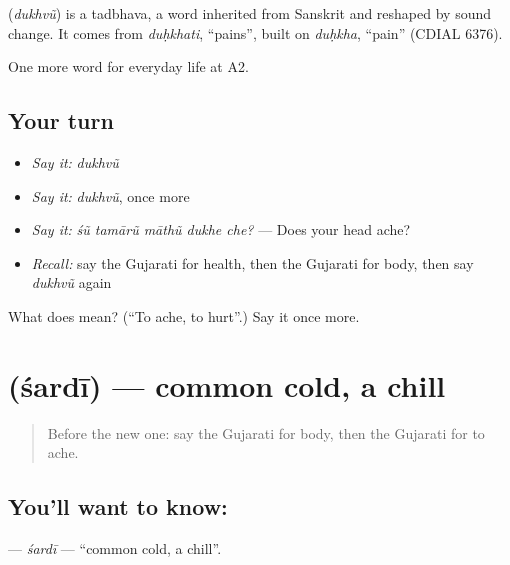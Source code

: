 \begin{cousinweb}
\textbf{} (\emph{dukhvũ}) is a tadbhava, a word inherited from Sanskrit and reshaped by sound change. It comes from \emph{duḥkhati}, \textquotedblleft{}pains\textquotedblright{}, built on \emph{duḥkha}, \textquotedblleft{}pain\textquotedblright{} (CDIAL 6376).
\end{cousinweb}

\begin{grammarlens}[title={What you've built}]
One more word for everyday life at A2.
\end{grammarlens}

\subsection*{Your turn}
\begin{itemize}
\raggedright
  \item \emph{Say it:} \emph{dukhvũ}
  \item \emph{Say it:} \emph{dukhvũ}, once more
  \item \emph{Say it:} \emph{śũ tamārũ māthũ dukhe che?} — Does your head ache?
  \item \emph{Recall:} say the Gujarati for health, then the Gujarati for body, then say \emph{dukhvũ} again
\end{itemize}

\begin{tcolorbox}[breakable,colback=teal!4,colframe=teal!35!black,title={Before you move on}]
What does  mean? (\textquotedblleft{}To ache, to hurt\textquotedblright{}.) Say it once more.
\end{tcolorbox}
\section[\texorpdfstring{\gu{શરદી} (śardī)}{શરદી (śardī)}]{ (śardī) — common cold, a chill}

\label{lesson:GU-C223-shardi}



\begin{quote}
Before the new one: say the Gujarati for body, then the Gujarati for to ache.
\end{quote}

\subsection*{You'll want to know: }
\textbf{} — \emph{śardī} — \textquotedblleft{}common cold, a chill\textquotedblright{}.

